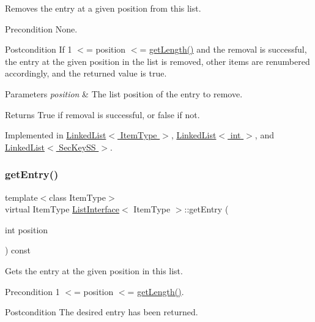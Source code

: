 Removes the entry at a given position from this list. \begin{DoxyPrecond}{Precondition}
None. 
\end{DoxyPrecond}
\begin{DoxyPostcond}{Postcondition}
If 1 $<$= position $<$= \hyperlink{classListInterface_afc85695d4137f1e29ff02e179c9f3221}{get\+Length()} and the removal is successful, the entry at the given position in the list is removed, other items are renumbered accordingly, and the returned value is true. 
\end{DoxyPostcond}

\begin{DoxyParams}{Parameters}
{\em position} & The list position of the entry to remove. \\
\hline
\end{DoxyParams}
\begin{DoxyReturn}{Returns}
True if removal is successful, or false if not. 
\end{DoxyReturn}


Implemented in \hyperlink{classLinkedList_a7dc3cca217b45c6fe5d28c9d16b7bf9e}{Linked\+List$<$ Item\+Type $>$}, \hyperlink{classLinkedList_a7dc3cca217b45c6fe5d28c9d16b7bf9e}{Linked\+List$<$ int $>$}, and \hyperlink{classLinkedList_a7dc3cca217b45c6fe5d28c9d16b7bf9e}{Linked\+List$<$ Sec\+Key\+S\+S $>$}.

\mbox{\label{classListInterface_a86987f69e5056d287212ede41db1956a}} 
\subsubsection{\texorpdfstring{get\+Entry()}{getEntry()}}
{\footnotesize\ttfamily template$<$class Item\+Type$>$ \\
virtual Item\+Type \hyperlink{classListInterface}{List\+Interface}$<$ Item\+Type $>$\+::get\+Entry (\begin{DoxyParamCaption}\item[{int}]{position }\end{DoxyParamCaption}) const\hspace{0.3cm}{\ttfamily [pure virtual]}}

Gets the entry at the given position in this list. \begin{DoxyPrecond}{Precondition}
1 $<$= position $<$= \hyperlink{classListInterface_afc85695d4137f1e29ff02e179c9f3221}{get\+Length()}. 
\end{DoxyPrecond}
\begin{DoxyPostcond}{Postcondition}
The desired entry has been returned. 
\end{DoxyPostcond}

